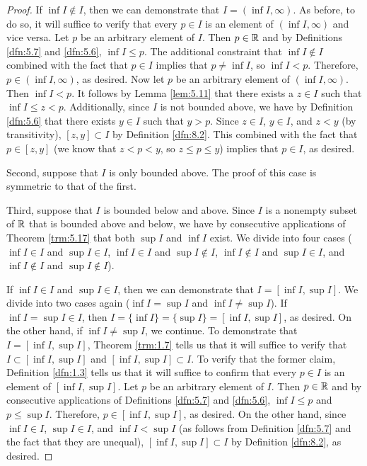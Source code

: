 \documentclass[../main.tex]{subfiles}
\begin{document}
\begin{lemma}
\begin{proof}
        If $\inf I\notin I$, then we can demonstrate that $I=(\inf I,\infty)$. As before, to do so, it will suffice to verify that every $p\in I$ is an element of $(\inf I,\infty)$ and vice versa. Let $p$ be an arbitrary element of $I$. Then $p\in\mathbb{R}$ and by Definitions \ref{dfn:5.7} and \ref{dfn:5.6}, $\inf I\leq p$. The additional constraint that $\inf I\notin I$ combined with the fact that $p\in I$ implies that $p\neq\inf I$, so $\inf I<p$. Therefore, $p\in(\inf I,\infty)$, as desired. Now let $p$ be an arbitrary element of $(\inf I,\infty)$. Then $\inf I<p$. It follows by Lemma \ref{lem:5.11} that there exists a $z\in I$ such that $\inf I\leq z<p$. Additionally, since $I$ is not bounded above, we have by Definition \ref{dfn:5.6} that there exists $y\in I$ such that $y>p$. Since $z\in I$, $y\in I$, and $z<y$ (by transitivity), $[z,y]\subset I$ by Definition \ref{dfn:8.2}. This combined with the fact that $p\in[z,y]$ (we know that $z<p<y$, so $z\leq p\leq y$) implies that $p\in I$, as desired.\par\smallskip
        Second, suppose that $I$ is only bounded above. The proof of this case is symmetric to that of the first.\par\smallskip
        Third, suppose that $I$ is bounded below and above. Since $I$ is a nonempty subset of $\mathbb{R}$ that is bounded above and below, we have by consecutive applications of Theorem \ref{trm:5.17} that both $\sup I$ and $\inf I$ exist. We divide into four cases ($\inf I\in I$ and $\sup I\in I$, $\inf I\in I$ and $\sup I\notin I$, $\inf I\notin I$ and $\sup I\in I$, and $\inf I\notin I$ and $\sup I\notin I$).\par
        If $\inf I\in I$ and $\sup I\in I$, then we can demonstrate that $I=[\inf I,\sup I]$. We divide into two cases again ($\inf I=\sup I$ and $\inf I\neq\sup I$). If $\inf I=\sup I\in I$, then $I=\{\inf I\}=\{\sup I\}=[\inf I,\sup I]$, as desired. On the other hand, if $\inf I\neq\sup I$, we continue. To demonstrate that $I=[\inf I,\sup I]$, Theorem \ref{trm:1.7} tells us that it will suffice to verify that $I\subset[\inf I,\sup I]$ and $[\inf I,\sup I]\subset I$. To verify that the former claim, Definition \ref{dfn:1.3} tells us that it will suffice to confirm that every $p\in I$ is an element of $[\inf I,\sup I]$. Let $p$ be an arbitrary element of $I$. Then $p\in\mathbb{R}$ and by consecutive applications of Definitions \ref{dfn:5.7} and \ref{dfn:5.6}, $\inf I\leq p$ and $p\leq\sup I$. Therefore, $p\in[\inf I,\sup I]$, as desired. On the other hand, since $\inf I\in I$, $\sup I\in I$, and $\inf I<\sup I$ (as follows from Definition \ref{dfn:5.7} and the fact that they are unequal), $[\inf I,\sup I]\subset I$ by Definition \ref{dfn:8.2}, as desired.\par

\end{proof}
\end{lemma}
\end{document}
